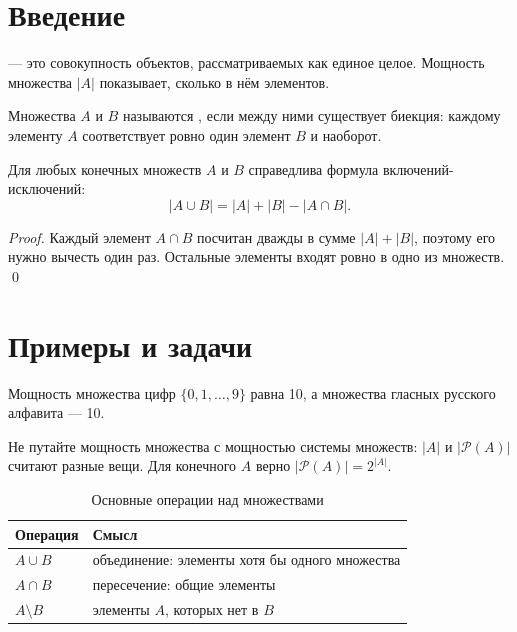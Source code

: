 
\tableofcontents

\section{Введение}

 — это совокупность объектов, рассматриваемых как единое целое.
Мощность множества $|A|$ показывает, сколько в нём элементов.

\begin{definition}
Множества $A$ и $B$ называются , если между ними существует
биекция: каждому элементу $A$ соответствует ровно один элемент $B$ и наоборот.
\end{definition}

\begin{theorem}
Для любых конечных множеств $A$ и $B$ справедлива формула включений-исключений:
\[ |A \cup B| = |A| + |B| - |A \cap B|. \]
\end{theorem}

\begin{proof}
Каждый элемент $A \cap B$ посчитан дважды в сумме $|A| + |B|$, поэтому его нужно
вычесть один раз. Остальные элементы входят ровно в одно из множеств.
\qed
\end{proof}

\section{Примеры и задачи}

\begin{example}
Мощность множества цифр $\{0, 1, \ldots, 9\}$ равна 10, а множества гласных
русского алфавита — 10.
\end{example}

\begin{important}
Не путайте мощность множества с мощностью системы множеств: $|A|$ и $|\mathcal{P}(A)|$
считают разные вещи. Для конечного $A$ верно $|\mathcal{P}(A)| = 2^{|A|}$.
\end{important}

\begin{table}[h]
\centering
\begin{tabularx}{0.8\linewidth}{lX}
\toprule
Операция & Смысл \\
\midrule
$A \cup B$ & объединение: элементы хотя бы одного множества \\
$A \cap B$ & пересечение: общие элементы \\
$A \setminus B$ & элементы $A$, которых нет в $B$ \\
\bottomrule
\end{tabularx}
\caption{Основные операции над множествами}
\end{table}

